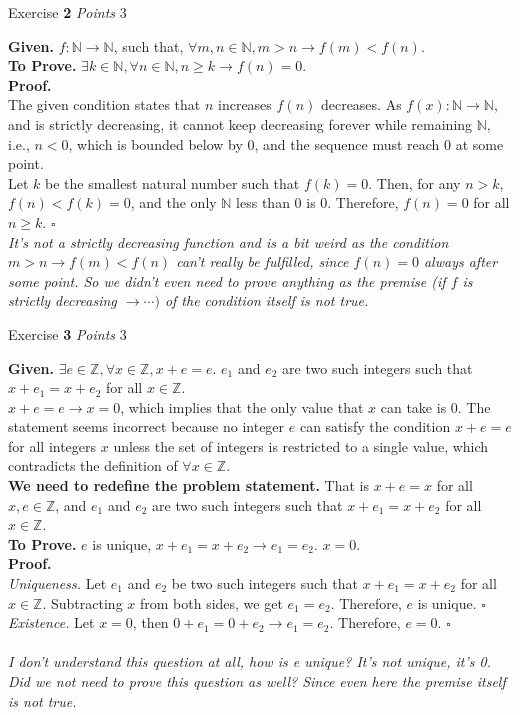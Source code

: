 \documentclass[11pt]{article}
\newcommand{\problem
}[2]{
\begin{mdframed}
    Exercise \textbf{#1} \hfill \emph{Points }#2
\end{mdframed}
}
\begin{document}
\problem{2}{3}
\textbf{Given. } $f: \mathbb{N} \to \mathbb{N}$, such that, $\forall m, n \in \mathbb{N}, m > n \rightarrow f(m) < f(n)$. \\
\noindent \textbf{To Prove. } $\exists k \in \mathbb{N}, \forall n \in \mathbb{N}, n \geq k \rightarrow f(n) = 0$.\\
\noindent \textbf{Proof. }\\
The given condition states that $n$ increases $f(n)$ decreases. As $f(x): \mathbb{N} \rightarrow \mathbb{N}$, and is strictly decreasing, it cannot keep decreasing forever while remaining $\mathbb{N}$, i.e., $n < 0$, which is bounded below by 0, and the sequence must reach 0 at some point. \medskip \\
Let $k$ be the smallest natural number such that $f(k) = 0$.
Then, for any $n > k$, $f(n) < f(k) = 0$, and the only $\mathbb{N}$ less than 0 is 0. Therefore, $f(n) = 0$ for all $n \geq k$. \hfill $\square$\medskip \\
\emph{ It's not a strictly decreasing function and is a bit weird as the condition $m > n \rightarrow f(m) < f(n)$ can't really be fulfilled, since $f(n)=0$ always after some point. So we didn't even need to prove anything as the premise (if $f$ is strictly decreasing $\rightarrow \cdots)$ of the condition itself is not true.}\\



\problem{3}{3}
\textbf{Given. } $\exists e \in \mathbb{Z}, \forall x \in \mathbb{Z}, x + e = e$. $e_1$ and $e_2$ are two such integers such that $x + e_1 = x + e_2$ for all $x \in \mathbb{Z}$. \\
\noindent $x + e = e \rightarrow x = 0$, which implies that the only value that $x$ can take is 0. The statement seems incorrect because no integer $e$ can satisfy the condition $x+e=e$ for all integers $x$ unless the set of integers is restricted to a single value, which contradicts the definition of $\forall x \in \mathbb{Z}$.\\

\noindent \textbf{We need to redefine the problem statement.} That is $x+e = x$ for all $x, e \in \mathbb{Z}$, and $e_1$ and $e_2$ are two such integers such that $x + e_1 = x + e_2$ for all $x \in \mathbb{Z}$. \\

\noindent \textbf{To Prove. } $e$ is unique, $x + e_1 = x + e_2 \rightarrow e_1 = e_2$. $x=0$.\\
\textbf{Proof. }\\
\emph{Uniqueness.} Let $e_1$ and $e_2$ be two such integers such that $x + e_1 = x + e_2$ for all $x \in \mathbb{Z}$. Subtracting $x$ from both sides, we get $e_1 = e_2$. Therefore, $e$ is unique. \hfill $\square$\\
\emph{Existence.} Let $x = 0$, then $0 + e_1 = 0 + e_2 \rightarrow e_1 = e_2$. Therefore, $e = 0$. \hfill $\square$\\
\medskip \\
\emph{I don't understand this question at all, how is e unique? It's not unique, it's 0. Did we not need to prove this question as well? Since even here the premise itself is not true.}\\
\end{document}
